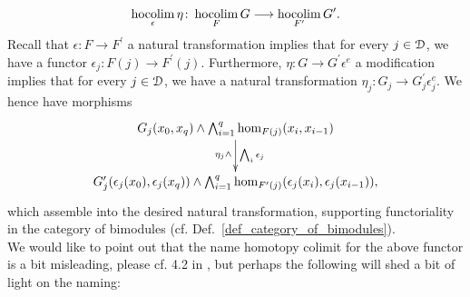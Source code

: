 \begin{defn}
    \begin{displaymath}
      \operatorname*{hocolim}_\epsilon \eta \colon \operatorname*{hocolim}_F G \longrightarrow \operatorname*{hocolim}_{F^\prime} G^\prime.
    \end{displaymath}
    Recall that $\epsilon \colon F \to F^\prime$ a natural transformation
    implies that for every $j \in \mathcal{D}$, we have a functor $\epsilon_j \colon
    F(j) \to F^\prime(j)$.
    Furthermore, $\eta \colon G \to G^\prime \epsilon^e$ a modification
    implies that for every $j \in \mathcal{D}$, we have a natural transformation
    $\eta_j \colon G_j \to G^\prime_j\epsilon^e_j$.
    We hence have morphisms
    \begin{displaymath}
      \xymatrix{
        G_j(x_0,x_q) \wedge \bigwedge_{i=1}^q \hom_{F(j)}(x_i,x_{i-1}) %
          \ar[d]_{\eta_j \wedge}^{\bigwedge_i \epsilon_j}
        \\
        G_j^\prime(\epsilon_j(x_0),\epsilon_j(x_q)) \wedge %
          \bigwedge_{i=1}^q \hom_{F^\prime(j)}(\epsilon_j(x_i),\epsilon_j(x_{i-1})),  
      }
    \end{displaymath}
    which assemble into the desired natural transformation, supporting
    functoriality in the category of bimodules (cf.
    Def.~\ref{def_category_of_bimodules}).\\
    We would like to point out that the name homotopy colimit for the above
    functor is a bit misleading, please cf. 4.2 in \cite{brun2010covering},
    but perhaps the following will shed a bit of light on the naming:
  \end{defn}
